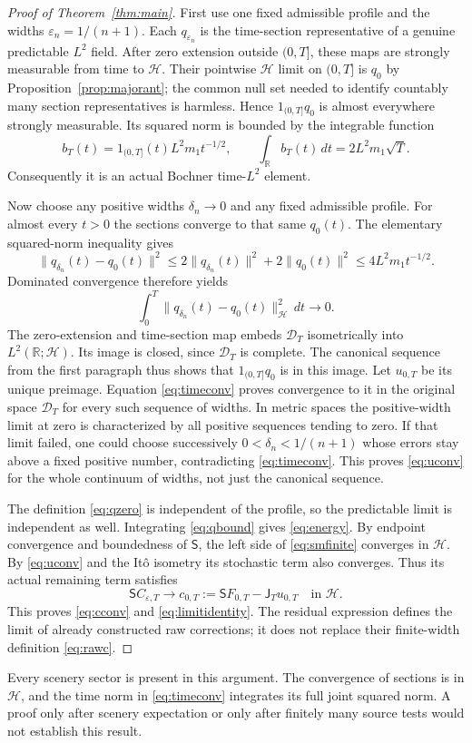 \documentclass[11pt]{article}
\newcommand{\R}{\mathbb R}
\newcommand{\HH}{\mathcal H}
\newcommand{\DD}{\mathcal D}
\newcommand{\Smo}{\mathsf S}
\newcommand{\J}{\mathsf J}
\begin{document}
\begin{proof}[Proof of Theorem~\ref{thm:main}]
First use one fixed admissible profile and the widths
$\varepsilon_n=1/(n+1)$. Each $q_{\varepsilon_n}$ is the
time-section representative of a genuine predictable $L^2$ field.
After zero extension outside $(0,T]$, these maps are strongly
measurable from time to $\HH$. Their pointwise $\HH$ limit on
$(0,T]$ is $q_0$ by Proposition~\ref{prop:majorant}; the common
null set needed to identify countably many section representatives
is harmless. Hence $1_{(0,T]}q_0$ is almost everywhere strongly
measurable. Its squared norm is bounded by the integrable function
\[
 b_T(t)=1_{(0,T]}(t)L^2m_1t^{-1/2},\qquad
 \int_\R b_T(t)\,dt=2L^2m_1\sqrt T.
\]
Consequently it is an actual Bochner time-$L^2$ element.

Now choose any positive widths $\delta_n\to0$ and any fixed
admissible profile. For almost every $t>0$ the sections converge
to that same $q_0(t)$. The elementary squared-norm inequality gives
\[
 \|q_{\delta_n}(t)-q_0(t)\|^2
 \leq2\|q_{\delta_n}(t)\|^2+2\|q_0(t)\|^2
 \leq4L^2m_1t^{-1/2}.
\]
Dominated convergence therefore yields
\begin{equation}\label{eq:timeconv}
 \int_0^T\|q_{\delta_n}(t)-q_0(t)\|_{\HH}^2\,dt\longrightarrow0.
\end{equation}
The zero-extension and time-section map embeds $\DD_T$ isometrically
into $L^2(\R;\HH)$. Its image is closed, since $\DD_T$ is complete.
The canonical sequence from the first paragraph thus shows that
$1_{(0,T]}q_0$ is in this image. Let $u_{0,T}$ be its unique
preimage. Equation \eqref{eq:timeconv} proves convergence to it
in the original space $\DD_T$ for every such sequence of widths.
In metric spaces the positive-width limit at zero is characterized
by all positive sequences tending to zero. If that limit failed,
one could choose successively $0<\delta_n<1/(n+1)$ whose errors
stay above a fixed positive number, contradicting
\eqref{eq:timeconv}. This proves \eqref{eq:uconv} for the whole
continuum of widths, not just the canonical sequence.

The definition \eqref{eq:qzero} is independent of the profile, so
the predictable limit is independent as well. Integrating
\eqref{eq:qbound} gives \eqref{eq:energy}. By endpoint convergence
and boundedness of $\Smo$, the left side of \eqref{eq:smfinite}
converges in $\HH$. By \eqref{eq:uconv} and the It\^o isometry
its stochastic term also converges. Thus its actual remaining
term satisfies
\[
 \Smo C_{\varepsilon,T}\longrightarrow
 c_{0,T}:=\Smo F_{0,T}-\J_Tu_{0,T}
 \quad\text{in }\HH.
\]
This proves \eqref{eq:cconv} and \eqref{eq:limitidentity}.
The residual expression defines the limit of already constructed
raw corrections; it does not replace their finite-width
definition \eqref{eq:rawc}.
\end{proof}
Every scenery sector is present in this argument. The convergence
of sections is in $\HH$, and the time norm in
\eqref{eq:timeconv} integrates its full joint squared norm. A
proof only after scenery expectation or only after finitely many
source tests would not establish this result.
\end{document}
